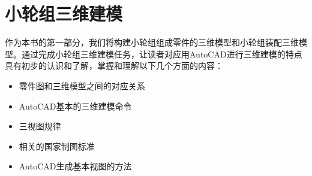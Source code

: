 \documentclass[12pt,a4paper,twoside,openany]{book}
\begin{document}

\title{}
\author{}
\date{\today}
\maketitle
\frontmatter

\tableofcontents
\mainmatter
\graphicspath{{pdf/}{png/}}
\part{小轮组三维建模}
作为本书的第一部分，我们将构建小轮组组成零件的三维模型和小轮组装配三维模型。通过完成小轮组三维建模任务，让读者对应用AutoCAD进行三维建模的特点具有初步的认识和了解，掌握和理解以下几个方面的内容：
\begin{itemize}
\item 零件图和三维模型之间的对应关系
\item AutoCAD基本的三维建模命令
\item 三视图规律
\item 相关的国家制图标准
\item AutoCAD生成基本视图的方法
\end{itemize} 


























%




\end{document}
